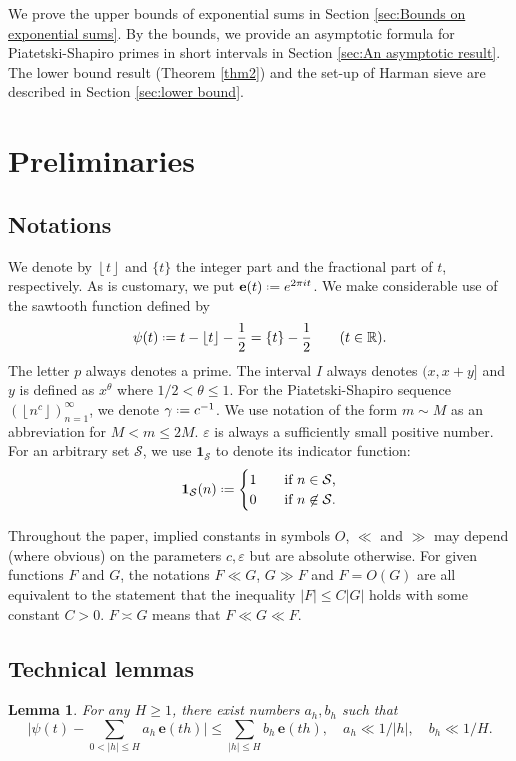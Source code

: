 \documentclass[12pt, reqno, twoside, letterpaper]{amsart}
\numberwithin{equation}{section}
\def\eps{\varepsilon}
\def\fl#1{\left\lfloor#1\right\rfloor}
\newcommand{\ind}[1]{\ensuremath{\mathbf{1}_{#1}}}  %
\newcommand{\e}{\ensuremath{\mathbf{e}}}
\newcommand{\cS}{\ensuremath{\mathcal{S}}}
\newcommand{\RR}{\ensuremath{\mathbb{R}}}
\theoremstyle{customthm}
\newtheorem{lemma}[X]{Lemma}
\theoremstyle{customrem}
\renewcommand{\le}{\ensuremath{\leqslant}}
\renewcommand{\ge}{\ensuremath{\geqslant}}
\def\fl#1{\left\lfloor#1\right\rfloor}
\newcommand*{\defeq}{\mathrel{\vcenter{\baselineskip0.5ex \lineskiplimit0pt
			\hbox{\scriptsize.}\hbox{\scriptsize.}}}%
	=}
\begin{document}
We prove the upper bounds of exponential sums in Section \ref{sec:Bounds on exponential sums}. By the bounds, we provide an asymptotic formula for Piatetski-Shapiro primes in short intervals in Section \ref{sec:An asymptotic result}. The lower bound result (Theorem \ref{thm2}) and the set-up of Harman sieve are described in Section \ref{sec:lower bound}. 

\section{Preliminaries}
	
\subsection{Notations}
	
	We denote by $\fl{t}$ and $\{t\}$ the integer part and the fractional part of $t$, respectively. As is customary, we put $\e(t)\defeq e^{2\pi it}$. We make considerable use of the sawtooth function defined by
	$$
	\psi(t) \defeq t-\fl{t}-\frac{1}{2}=\{t\}-\frac{1}{2}\qquad(t\in\RR).
	$$
	The letter $p$ always denotes a prime. The interval $I$ always denotes $(x,x+y]$ and $y$ is defined as $x^{\theta}$ where $1/2<\theta \leqslant 1$. For the Piatetski-Shapiro sequence $(\fl{n^c})_{n=1}^\infty$, we denote $\gamma \defeq c^{-1}$. 
	We use notation of the form $m\sim M$ as an abbreviation for $M< m\le 2M$. $\eps$ is always a sufficiently small positive number. For an arbitrary set $\cS$, we use $\ind{\cS}$ to denote its indicator function:
	$$
	\ind{\cS}(n)\defeq\begin{cases}
		1&\quad\hbox{if $n\in\cS$,}\\
		0&\quad\hbox{if $n\not\in\cS$.}\\
	\end{cases}
	$$
	
	Throughout the paper, implied constants in symbols $O$, $\ll$ and $\gg$ may depend (where obvious) on the parameters $c, \eps$ but are absolute otherwise. For given functions $F$ and $G$, the notations $F\ll G$, $G\gg F$ and $F=O(G)$ are all equivalent to the statement that the inequality $|F|\le C|G|$ holds with some constant $C>0$. $F \asymp G$ means that $F \ll G \ll F$. 
	
\subsection{Technical lemmas}
	
	\begin{lemma}
		\label{lem:Vaaler}
		For any $H\ge 1$, there exist numbers $a_h,b_h$ such that
		$$
		\bigg|\psi(t)-\sum_{0<|h|\le H}a_h\,\e(th)\bigg|
		\le\sum_{|h|\le H}b_h\,\e(th),\quad
		a_h\ll 1/|h|,\quad b_h\ll 1/H.
		$$
	\end{lemma}
	
\end{document}
